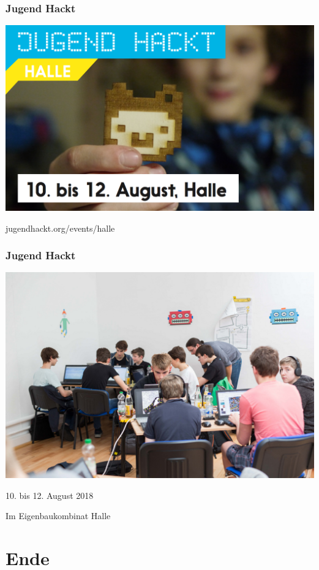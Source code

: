 \documentclass[12pt]{beamer}
\begin{document}
	\begin{frame}
		\frametitle{Jugend Hackt}
		\begin{center}
			\includegraphics[height=0.7\textheight]{img//jh-halle.png}
			\vspace{10pt}
			
			jugendhackt.org/events/halle
		\end{center}
	\end{frame}
	\begin{frame}
		\frametitle{Jugend Hackt}
		\begin{center}
			\includegraphics[height=0.7\textheight]{img//jugend_hackt_flickr_Open_Knowledge_Foundation_Deutschland_cc_by_20.jpg}

			10. bis 12. August 2018

			Im Eigenbaukombinat Halle
		\end{center}
	\end{frame}

\section{Ende}
\end{document}
